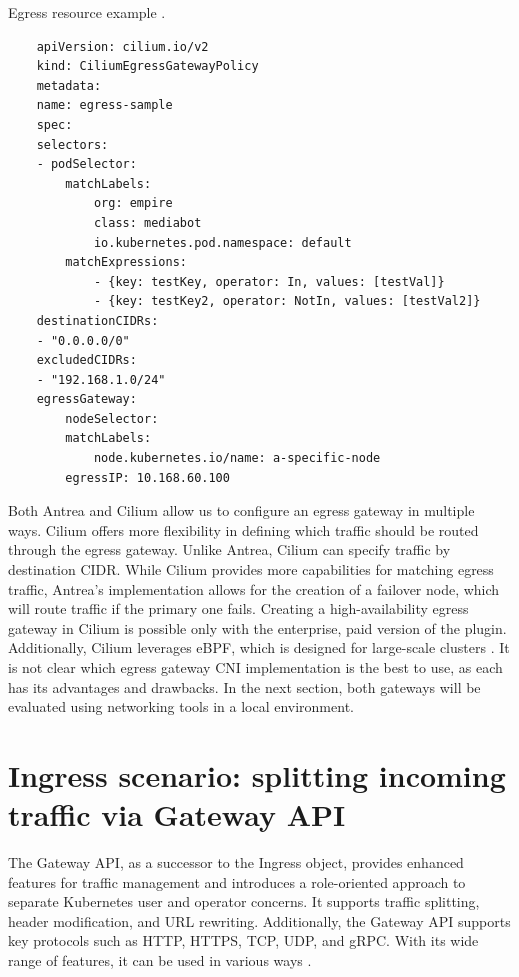 \begin{listing}[htb]
    \centering
    \caption{Egress resource example \cite{AntreaEgressArch}.}
    \begin{verbatim}
    apiVersion: cilium.io/v2
    kind: CiliumEgressGatewayPolicy
    metadata:
    name: egress-sample
    spec:
    selectors:
    - podSelector:
        matchLabels:
            org: empire
            class: mediabot
            io.kubernetes.pod.namespace: default
        matchExpressions:
            - {key: testKey, operator: In, values: [testVal]}
            - {key: testKey2, operator: NotIn, values: [testVal2]}
    destinationCIDRs:
    - "0.0.0.0/0"
    excludedCIDRs:
    - "192.168.1.0/24"
    egressGateway:
        nodeSelector:
        matchLabels:
            node.kubernetes.io/name: a-specific-node
        egressIP: 10.168.60.100
    \end{verbatim}
    \label{lst:yamlCiliumEgressGatewayPolicy}
\end{listing}


Both Antrea and Cilium allow us to configure an egress gateway in multiple ways. Cilium offers more flexibility in defining which traffic should be routed through the egress gateway. Unlike Antrea, Cilium can specify traffic by destination CIDR. While Cilium provides more capabilities for matching egress traffic, Antrea's implementation allows for the creation of a failover node, which will route traffic if the primary one fails. Creating a high-availability egress gateway in Cilium is possible only with the enterprise, paid version of the plugin. Additionally, Cilium leverages eBPF, which is designed for large-scale clusters \cite{CiliumOverview}. It is not clear which egress gateway CNI implementation is the best to use, as each has its advantages and drawbacks. In the next section, both gateways will be evaluated using networking tools in a local environment.




\section{Ingress scenario: splitting incoming traffic via Gateway API}
\label{sec:ingress}

The Gateway API, as a successor to the Ingress object, provides enhanced features for traffic management and introduces a role-oriented approach to separate Kubernetes user and operator concerns. It supports traffic splitting, header modification, and URL rewriting. Additionally, the Gateway API supports key protocols such as HTTP, HTTPS, TCP, UDP, and gRPC. With its wide range of features, it can be used in various ways \cite{CiliumGatewayAPIBlog}.

